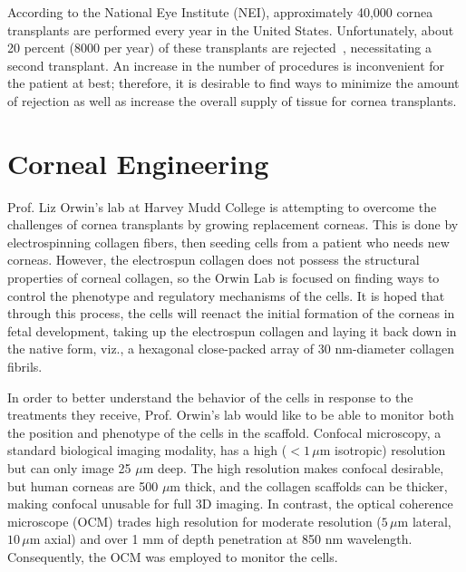 According to the National Eye Institute (NEI), approximately 40,000 cornea transplants are performed every year in the United States. Unfortunately, about 20 percent (8000 per year) of these transplants are rejected~\citep{NEIcornea}, necessitating a second transplant. An increase in the number of procedures is inconvenient for the patient at best; therefore, it is desirable to find ways to minimize the amount of rejection as well as increase the overall supply of tissue for cornea transplants.

\section{Corneal Engineering}
\label{cornealengineering}

Prof. Liz Orwin's lab at Harvey Mudd College is attempting to overcome the challenges of cornea transplants by growing replacement corneas. This is done by electrospinning collagen fibers, then seeding cells from a patient who needs new corneas. However, the electrospun collagen does not possess the structural properties of corneal collagen, so the Orwin Lab is focused on finding ways to control the phenotype and regulatory mechanisms of the cells. It is hoped that through this process, the cells will reenact the initial formation of the corneas in fetal development, taking up the electrospun collagen and laying it back down in the native form, viz., a hexagonal close-packed array of 30 nm-diameter collagen fibrils.

In order to better understand the behavior of the cells in response to the treatments they receive, Prof. Orwin's lab would like to be able to monitor both the position and phenotype of the cells in the scaffold. Confocal microscopy, a standard biological imaging modality, has a high ($<1\,\mu$m isotropic) resolution but can only image 25 $\mu$m deep. The high resolution makes confocal desirable, but human corneas are 500 $\mu$m thick, and the collagen scaffolds can be thicker, making confocal unusable for full 3D imaging. In contrast, the optical coherence microscope (OCM) trades high resolution for moderate resolution ($5\,\mu$m lateral, $10\,\mu$m axial) and over 1 mm of depth penetration at 850 nm wavelength. Consequently, the OCM was employed to monitor the cells.

